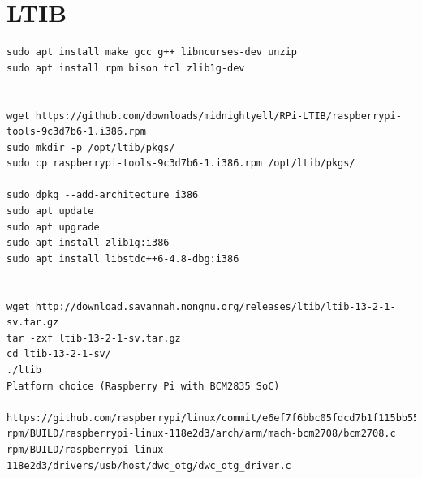\documentclass[printmode]{mgr}
\begin{document}
\section{LTIB}



%



\begin{lstlisting}
sudo apt install make gcc g++ libncurses-dev unzip
sudo apt install rpm bison tcl zlib1g-dev


wget https://github.com/downloads/midnightyell/RPi-LTIB/raspberrypi-tools-9c3d7b6-1.i386.rpm
sudo mkdir -p /opt/ltib/pkgs/
sudo cp raspberrypi-tools-9c3d7b6-1.i386.rpm /opt/ltib/pkgs/

sudo dpkg --add-architecture i386
sudo apt update
sudo apt upgrade
sudo apt install zlib1g:i386
sudo apt install libstdc++6-4.8-dbg:i386


wget http://download.savannah.nongnu.org/releases/ltib/ltib-13-2-1-sv.tar.gz
tar -zxf ltib-13-2-1-sv.tar.gz
cd ltib-13-2-1-sv/
./ltib
Platform choice (Raspberry Pi with BCM2835 SoC)

https://github.com/raspberrypi/linux/commit/e6ef7f6bbc05fdcd7b1f115bb55a32c176663296
rpm/BUILD/raspberrypi-linux-118e2d3/arch/arm/mach-bcm2708/bcm2708.c
rpm/BUILD/raspberrypi-linux-118e2d3/drivers/usb/host/dwc_otg/dwc_otg_driver.c
\end{lstlisting}
\end{document}

